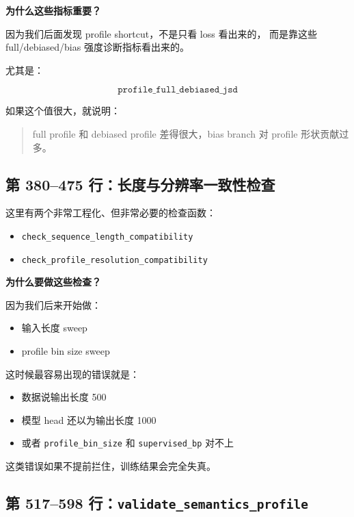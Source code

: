\documentclass[11pt,a4paper]{ctexart}
\begin{document}
\textbf{为什么这些指标重要？}

因为我们后面发现 profile shortcut，不是只看 loss 看出来的，
而是靠这些 full/debiased/bias 强度诊断指标看出来的。

尤其是：

\[
\texttt{profile\_full\_debiased\_jsd}
\]

如果这个值很大，就说明：

\begin{quote}
full profile 和 debiased profile 差得很大，bias branch 对 profile 形状贡献过多。
\end{quote}

\subsection{第 380--475 行：长度与分辨率一致性检查}

这里有两个非常工程化、但非常必要的检查函数：

\begin{itemize}[leftmargin=2em]
\item \texttt{check\_sequence\_length\_compatibility}
\item \texttt{check\_profile\_resolution\_compatibility}
\end{itemize}

\textbf{为什么要做这些检查？}

因为我们后来开始做：

\begin{itemize}[leftmargin=2em]
\item 输入长度 sweep
\item profile bin size sweep
\end{itemize}

这时候最容易出现的错误就是：

\begin{itemize}[leftmargin=2em]
\item 数据说输出长度 500
\item 模型 head 还以为输出长度 1000
\item 或者 \texttt{profile\_bin\_size} 和 \texttt{supervised\_bp} 对不上
\end{itemize}

这类错误如果不提前拦住，训练结果会完全失真。

\subsection{第 517--598 行：\texttt{validate\_semantics\_profile}}
\end{document}
